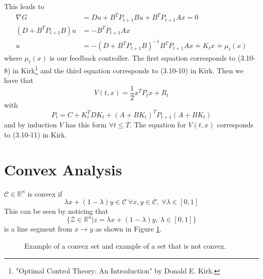 This leads to
\begin{align*}
\nabla G &= Du + B^TP_{t+1}Bu + B^TP_{t+1}Ax = 0 \\
(D+B^TP_{t+1}B)u &= -B^TP_{t+1}Ax \\
u &= -(D+B^TP_{t+1}B)^{-1}B^TP_{t+1}Ax \doteq K_tx \doteq \mu_t(x)
\end{align*}
where $\mu_t(x)$ is our feedback controller. The first equation corresponds to (3.10-8) in Kirk\footnote{"Optimal Control Theory: An Introduction" by Donald E. Kirk.} and the third equation corresponds to (3.10-10) in Kirk. Then we have that
$$V(t,x) = \frac{1}{2}x^TP_tx + R_t$$
with
$$P_t = C+ K_t^TDK_t + (A+BK_t)^TP_{t+1}(A+BK_t)$$
and by induction $V$ has this form $\forall t\leq T$. The equation for $V(t,x)$ corresponds to (3.10-11) in Kirk.

\section{Convex Analysis}
\begin{definition}
$\mathcal{C}\in\mathbb{R}^n$ is convex if
$$\lambda x + (1-\lambda)y \in \mathcal{C} ~\forall x,y\in\mathcal{C}, ~\forall \lambda\in[0,1]$$
This can be seen by noticing that
$$\{\mathcal{Z}\in\mathbb{R}^n | z=\lambda x+(1-\lambda)y, ~\lambda\in[0,1]\}$$
is a line segment from $x\to y$ as shown in Figure \ref{fig:05convex}.
\end{definition}

\begin{figure}[ht!]
	\centering
	 \hfill
	\caption{ Example of a convex set and  example of a set that is not convex.}
	\label{fig:05convex}
\end{figure}

